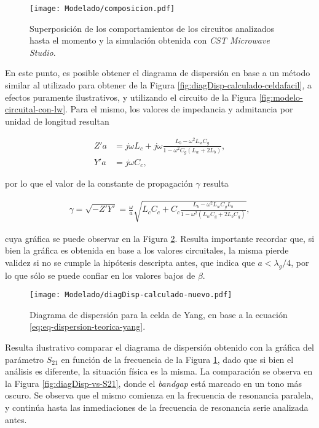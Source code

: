 \begin{figure}[h]
	\centering
	\texttt{[image: Modelado/composicion.pdf]}
	\caption{Superposición de los comportamientos de los circuitos analizados hasta el momento y la simulación obtenida con \textit{CST Microwave Studio}.}
	\label{fig:modelo-circuital-resonancia-serie-graficos}
\end{figure}

En este punto, es posible obtener el diagrama de dispersión en base a un método similar al utilizado para obtener de la Figura \ref{fig:diagDisp-calculado-celdafacil}, a efectos puramente ilustrativos, y utilizando el circuito de la Figura \ref{fig:modelo-circuital-con-lw}. Para el mismo, los valores de impedancia y admitancia por unidad de longitud resultan

\begin{align}
	Z' a &= j\omega L_c + j\omega \frac{L_b - \omega^2 L_w C_g}{1-\omega^2 C_g (L_w + 2 L_b)}, \\
	Y' a &= j \omega C_c,
\end{align}

por lo que el valor de la constante de propagación $\gamma$ resulta

\begin{align}
	\label{eq:eq-dispersion-teorica-yang}
	\gamma = \sqrt{-Z' Y'} = \frac{\omega}{a} \sqrt{L_c C_c + C_c \frac{L_b - \omega^2 L_w C_g L_b}{1-\omega^2(L_w C_g + 2 L_b C_g)}},
\end{align}

cuya gráfica se puede observar en la Figura \ref{fig:grafica-diagdisp-celdaYang-teorica}. Resulta importante recordar que, si bien la gráfica es obtenida en base a los valores circuitales, la misma pierde validez si no se cumple la hipótesis descripta antes, que indica que $a < \lambda_g/4$, por lo que sólo se puede confiar en los valores bajos de $\beta$.

\begin{figure}[h]
	\centering
	\texttt{[image: Modelado/diagDisp-calculado-nuevo.pdf]}
	\caption{Diagrama de dispersión para la celda de Yang, en base a la ecuación \ref{eq:eq-dispersion-teorica-yang}.}
	\label{fig:grafica-diagdisp-celdaYang-teorica}
\end{figure}

Resulta ilustrativo comparar el diagrama de dispersión obtenido con la gráfica del parámetro $S_{21}$ en función de la frecuencia de la Figura \ref{fig:modelo-circuital-resonancia-serie-graficos}, dado que si bien el análisis es diferente, la situación física es la misma. La comparación se observa en la Figura \ref{fig:diagDisp-vs-S21}, donde el \textit{bandgap} está marcado en un tono más oscuro. Se observa que el mismo comienza en la frecuencia de resonancia paralela, y continúa hasta las inmediaciones de la frecuencia de resonancia serie analizada antes.

